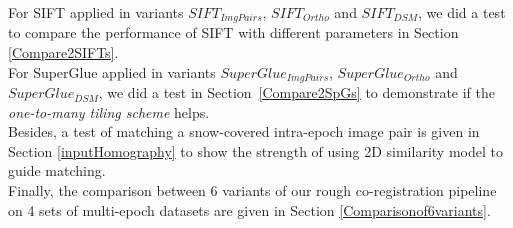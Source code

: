 For SIFT applied in variants $SIFT_{ImgPairs}$, $SIFT_{Ortho}$ and $SIFT_{DSM}$, we did a test to compare the performance of SIFT with different parameters in Section \ref{Compare2SIFTs}. \\
For SuperGlue applied in variants $SuperGlue_{ImgPairs}$, $SuperGlue_{Ortho}$ and $SuperGlue_{DSM}$, we did a test in Section~\ref{Compare2SpGs} to demonstrate if the \textit{one-to-many tiling scheme} helps. \\
Besides, a test of matching a snow-covered intra-epoch image pair is given in Section \ref{inputHomography} to show the strength of using 2D similarity model to guide matching.\\
Finally, the comparison between 6 variants of our rough co-registration pipeline on 4 sets of multi-epoch datasets are given in Section \ref{Comparisonof6variants}.\\





